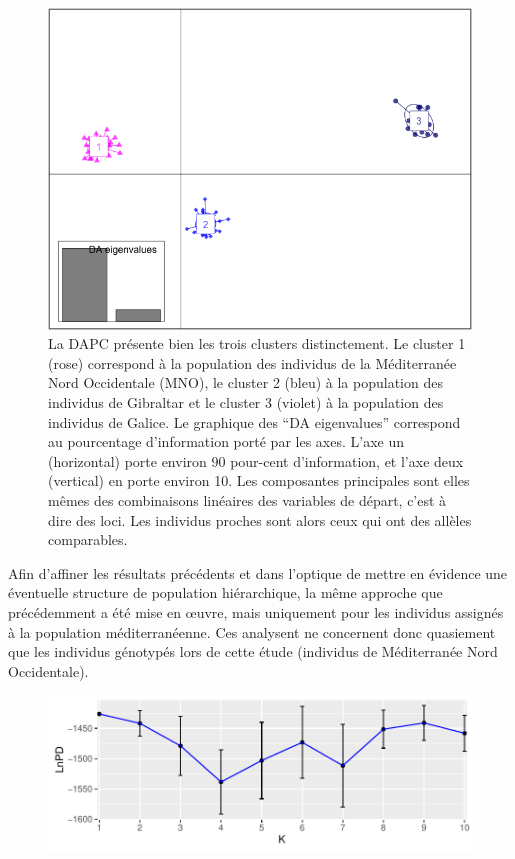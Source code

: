 \documentclass[a4paper,12pt,twoside]{article}\usepackage[]{graphicx}\usepackage[]{color}
\makeatletter
\def\maxwidth{ %
  \ifdim\Gin@nat@width>\linewidth
    \linewidth
  \else
    \Gin@nat@width
  \fi
}
\makeatother
\begin{document}
\begin {bibunit} [newbst]
\begin{figure}[htbp]
	\centering
		\includegraphics[width=.7\textwidth]{DAPC}
	\caption[DAPC]{La DAPC présente bien les trois clusters distinctement. Le cluster 1 (rose) correspond à la population des individus de la Méditerranée Nord Occidentale (MNO), le cluster 2 (bleu) à la population des individus de Gibraltar et le cluster 3 (violet) à la population des individus de Galice. Le graphique des ``DA eigenvalues'' correspond au pourcentage d'information porté par les axes. L'axe un (horizontal) porte environ 90 pour-cent d'information, et l'axe deux (vertical) en porte environ 10. Les composantes principales sont elles mêmes des combinaisons linéaires des variables de départ, c'est à dire des loci. Les individus proches sont alors ceux qui ont des allèles comparables.}
	\label{fig:DAPC}
\end{figure}


Afin d'affiner les résultats précédents et dans l'optique de mettre en évidence une éventuelle structure de population hiérarchique, la même approche que précédemment a été mise en \oe uvre, mais uniquement pour les individus assignés à la population méditerranéenne. Ces analysent ne concernent donc quasiement que les individus génotypés lors de cette étude (individus de Méditerranée Nord Occidentale).

\begin{figure}[htpb]

{\centering \includegraphics[width=\maxwidth]{figure/lnpd2-1} 

}
\end{figure}
\end{bibunit}
\end{document}
